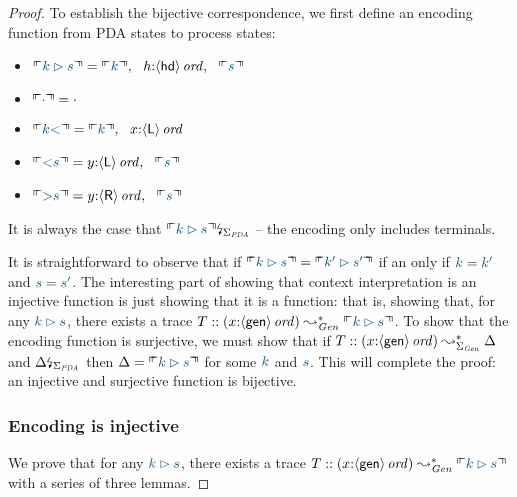 \begin{proof}To establish the bijective correspondence, we first define
an encoding function from PDA states to process states:
\smallskip
\begin{itemize}
\item $\ctxinterp{k \rhd s} = 
  \ctxinterp{k}, ~~
  h{:}\istrue{\susp{\sf hd}}, ~~
  \ctxinterp{s}$
\item $\ctxinterp{\cdot} = \cdot$
\item $\ctxinterp{k{\sf <}} = \ctxinterp{k}, ~~ x{:}\istrue{\susp{\sf L}}$
\item $\ctxinterp{{\sf <}s} = y{:}\istrue{\susp{\sf L}}, ~~ \ctxinterp{s}$
\item $\ctxinterp{{\sf >}s} = y{:}\istrue{\susp{\sf R}}, ~~ \ctxinterp{s}$
\end{itemize}
\smallskip 
It is always the case that $\restrictsig{\ctxinterp{k \rhd
    s}}{\Sigma_{\it PDA}}$ -- the encoding only includes terminals.

It is straightforward to observe that if $\ctxinterp{k \rhd s} =
\ctxinterp{k' \rhd s'}$ if an only if $\obj{k} = \obj{k'}$ and
$\obj{s} = \obj{s'}$. The interesting part of showing that context
interpretation is an injective function is just showing that it
is a function: that is, showing that, for any $\obj{k \rhd s}$, there
exists a trace $T :: (x{:}\istrue{\susp{\sf gen}}) \leadsto^*_{\it
  Gen} \ctxinterp{k \rhd s}$. To show that the encoding function is
surjective, we must show that if $T :: (x{:}{\langle {\sf gen} \rangle}\,{{\it ord}})
\leadsto^*_{\Sigma_{\it Gen}} \Delta$ and
${\Delta}{\mbox{\lightning}}_{\Sigma_{\it PDA}}$ then $\Delta = \ctxinterp{k
  \rhd s}$ for some $\obj{k}$ and $\obj{s}$. This will complete the
proof: an injective and surjective function is bijective.

\subsubsection{Encoding is injective}

We prove that for
any $\obj{k \rhd s}$, there exists a trace $T ::
(x{:}\istrue{\susp{\sf gen}}) \leadsto^*_{\it Gen} \ctxinterp{k \rhd
  s}$ with a series of three lemmas.


\end{proof}
